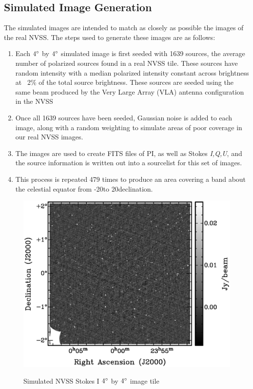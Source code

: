 \documentclass{article}
\begin{document}
\subsection{Simulated Image Generation}
The simulated images are intended to match as closely as possible the images 
of the real NVSS.  The steps used to generate these images are as follows:
\begin{enumerate}
	\item Each $4\degree$ by $4\degree$ simulated image is first seeded with 
	1639 sources, the average number of polarized sources found in a real NVSS 
	tile. These sources have random intensity with a median polarized intensity 
	constant across brightness at ~2\% of the total source brightness.  These
	sources are seeded using the same beam produced by the Very Large Array (VLA) antenna 
	configuration in the NVSS
	\item Once all 1639 sources have been seeded, Gaussian noise is added to 
	each image, along with a random weighting to simulate areas of poor 
	coverage in our real NVSS images.
	\item The images are used to create FITS files of PI, as well as Stokes 
	\emph{I,Q,U}, and the source information is written out into a sourcelist 
	for this set of images.
	\item This process is repeated 479 times to produce an area covering a band
	about the celestial equator from -20\degree to 20\degree declination.
\end{enumerate}
\pagebreak
\begin{figure}[H]
\begin{center}
\includegraphics[trim=0cm 0cm 0cm 0cm, clip, scale=0.65]{Simulation_I.eps}\\
\end{center}
\caption[Simulated NVSS Stokes I image]{Simulated NVSS Stokes I $4\degree$ by 
$4\degree$ image tile}
\end{figure}
\end{document}
